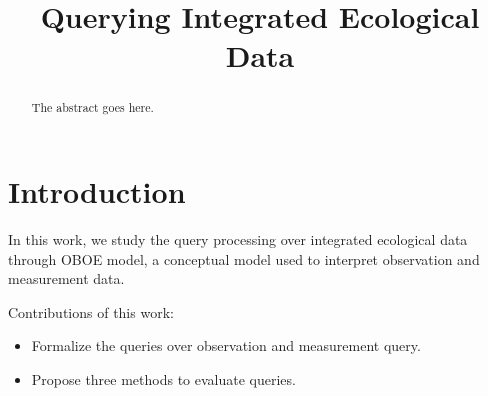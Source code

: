\documentclass[conference]{IEEEtran}
\begin{document}
\title{Querying Integrated Ecological Data}

\author{
\and
{}
\and
{}
}

\maketitle


\begin{abstract}
The abstract goes here.
\end{abstract}


\section{Introduction}
In this work, we study the query processing over integrated ecological
data through OBOE model\cite{DBLP:conf/er/BowersMS0}, a conceptual model used to interpret
observation and measurement data. 

Contributions of this work:
\begin{itemize}
\item Formalize the queries over observation and measurement query.
\item Propose three methods to evaluate queries. 
\end{itemize}
\end{document}
